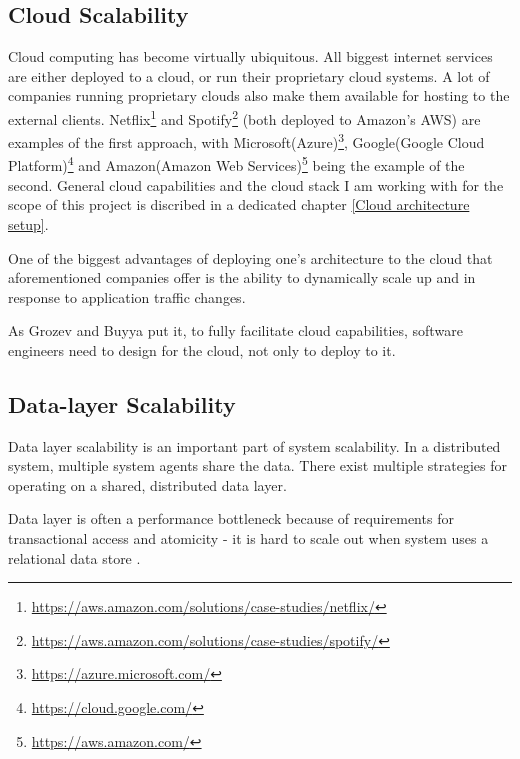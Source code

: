 \documentclass{uvamscse}
\begin{document}
\subsection{Cloud Scalability}
Cloud computing has become virtually ubiquitous. All biggest internet services are either deployed to a cloud, or run their proprietary cloud systems. A lot of companies running proprietary clouds also make them available for hosting to the external clients. Netflix\footnote{\url{https://aws.amazon.com/solutions/case-studies/netflix/}} and Spotify\footnote{\url{https://aws.amazon.com/solutions/case-studies/spotify/}} (both deployed to Amazon's AWS) are examples of the first approach, with Microsoft(Azure)\footnote{\url{https://azure.microsoft.com/}}, Google(Google Cloud Platform)\footnote{\url{https://cloud.google.com/}} and Amazon(Amazon Web Services)\footnote{\url{https://aws.amazon.com/}} being the example of the second.
General cloud capabilities and the cloud stack I am working with for the scope of this project is discribed in a dedicated chapter \ref{Cloud architecture setup}.

One of the biggest advantages of deploying one's architecture to the cloud that aforementioned companies offer is the ability to dynamically scale up and in response to application traffic changes.

As Grozev and Buyya \cite{GroBuy} put it, to fully facilitate cloud capabilities, software engineers need to design for the cloud, not only to deploy to it.

\subsection{Data-layer Scalability}

Data layer scalability is an important part of system scalability. In a distributed system, multiple system agents share the data. There exist multiple strategies for operating on a shared, distributed data layer.

Data layer is often a performance bottleneck because of requirements for transactional access and atomicity - it is hard to scale out when system uses a relational data store \cite{GroBuy}.
\end{document}
